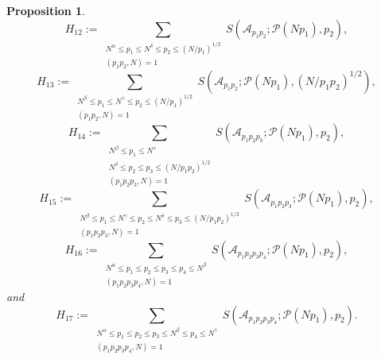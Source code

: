 \documentclass[12pt, a4paper]{amsart}
\def \N {{\mathbb N}}
\def\leq{\leqslant}
\def\le{\leqslant}
\theoremstyle{plain}
\newtheorem{proposition}{Proposition}[section]
\theoremstyle{remark}
\numberwithin{equation}{section}
\begin{document}
\begin{proposition}
\[\] 
\[
H_{12} := \sum_{\substack{N^{\alpha} \leq p_1 \le N^{\delta}\leq p_2 \le (N/p_1)^{1/2} \\ (p_1 p_2, N) = 1}} S(\mathscr{A}_{p_1 p_2}; \mathscr{P}(N p_1), p_2),
\] 
\[
H_{13} := \sum_{\substack{N^{\beta} \leq p_1 \le N^{\gamma} \leq p_2 \le (N/p_1)^{1/2} \\ (p_1 p_2, N) = 1}} S(\mathscr{A}_{p_1 p_2}; \mathscr{P}(N p_1), (N/p_1 p_2)^{1/2}),
\]
\[
H_{14} := \sum_{\substack{N^\beta \le p_1\le N^{\gamma}\\N^\delta \le p_2\le p_3\le (N/p_1p_2)^{1/2} \\ (p_1 p_2 p_3, N) = 1}}  S(\mathscr{A}_{p_1 p_2 p_3}; \mathscr{P}(Np_1), p_2),
\]
\[ 
H_{15} := \sum_{\substack{N^\beta \le p_1\le N^\gamma \le p_2\le N^{\delta}\le p_3\le (N/p_1p_2)^{1/2} \\ (p_1 p_2 p_3, N) = 1}}  S(\mathscr{A}_{p_1 p_2 p_3}; \mathscr{P}(Np_1), p_2),
\]
\[
H_{16} := \sum_{\substack{N^{\alpha} \leq p_1 \le p_2 \le p_3 \le p_4 \le N^{\beta} \\ (p_1 p_2 p_3 p_4, N) = 1}} S(\mathscr{A}_{p_1 p_2 p_3 p_4}; \mathscr{P}(Np_1), p_2),
\]
and 
\[
H_{17} := \sum_{\substack{N^{\alpha} \leq p_1 \le p_2 \le p_3 \le N^{\beta} \leq p_4 \le N^{\gamma}\\ (p_1 p_2 p_3 p_4, N) = 1}} S(\mathscr{A}_{p_1 p_2 p_3 p_4}; \mathscr{P}(Np_1), p_2).
\] 
\end{proposition}
	
\end{document}
